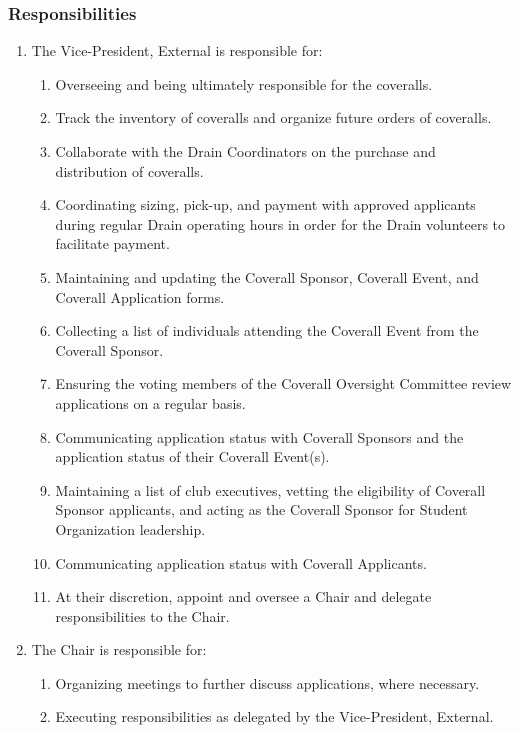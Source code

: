 \subsubsection{Responsibilities}
\label{coverall-responsibilities}
\begin{enumerate}
 \item
  The Vice-President, External is responsible for:
  \begin{enumerate}
   \item
    Overseeing and being ultimately responsible for the coveralls.
   \item
    Track the inventory of coveralls and organize future orders of coveralls.
   \item
    Collaborate with the Drain Coordinators on the purchase and distribution of coveralls.
   \item
    Coordinating sizing, pick-up, and payment with approved applicants during regular Drain operating hours in order for the Drain volunteers to facilitate payment.
   \item
    Maintaining and updating the Coverall Sponsor, Coverall Event, and Coverall Application forms.
   \item
    Collecting a list of individuals attending the Coverall Event from the Coverall Sponsor.
   \item
    Ensuring the voting members of the Coverall Oversight Committee review applications on a regular basis.
   \item
    Communicating application status with Coverall Sponsors and the application status of their Coverall Event(s).
   \item
    Maintaining a list of club executives, vetting the eligibility of Coverall Sponsor applicants, and acting as the Coverall Sponsor for Student Organization leadership.
   \item
    Communicating application status with Coverall Applicants.
   \item
    At their discretion, appoint and oversee a Chair and delegate responsibilities to the Chair.
  \end{enumerate}
 \item
  The Chair is responsible for:
  \begin{enumerate}
   \item
    Organizing meetings to further discuss applications, where necessary.
   \item Executing responsibilities as delegated by the Vice-President, External.
  \end{enumerate}
\end{enumerate}
